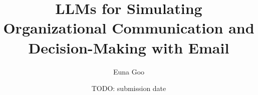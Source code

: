 \documentclass[11pt,a4paper]{report}
\title{LLMs for Simulating Organizational Communication and Decision-Making with Email}
\author{Euna Goo}
\date{TODO: submission date}
\begin{document}
\maketitle

\begin{abstract}
\end{abstract}

\tableofcontents













\appendix

\end{document}
